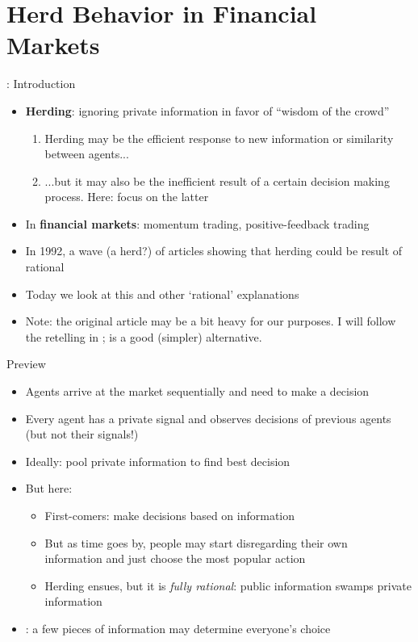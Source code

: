 \documentclass[english,10pt
,aspectratio=169
]{beamer}
\begin{document}
\section{Herd Behavior in Financial Markets}

\begin{frame}{\cite{smith_pathological_2000}: Introduction}
	\begin{itemize}
		\item \textbf{Herding}: ignoring private information in favor of ``wisdom of the crowd''
		\begin{enumerate}
			\item Herding may be the efficient response to new information or similarity between agents...
			\item ...but it may also be the inefficient result of a certain decision making process. Here: focus on the latter
		\end{enumerate}
		\item In \textbf{financial markets}: momentum trading, positive-feedback trading
		\item In 1992, a wave (a herd?) of articles showing that  herding could be result of rational 
		\item Today we look at this and other `rational' explanations
		\item Note: the original article may be a bit heavy for our purposes. I will follow the retelling in \cite{smith_observational_2011}; \cite{bikhchandani_herd_2000} is a good (simpler) alternative.
	\end{itemize}
\end{frame}


\begin{frame}{Preview}
	\begin{itemize}
		\item Agents arrive at the market sequentially and need to make a decision
		\item Every agent has a private signal and observes decisions of previous agents (but not their signals!)
		\item Ideally: pool private information to find best decision
		\item But here: 
		\begin{itemize}
			\item First-comers: make decisions based on information
			\item But as time goes by, people may start disregarding their own
			\\ information and just choose the most popular action
			\item Herding ensues, but it is \emph{fully rational}: public information swamps private information
		\end{itemize}
		\item {}: a few pieces of information may determine everyone's choice
	\end{itemize}
\end{frame}
\end{document}
